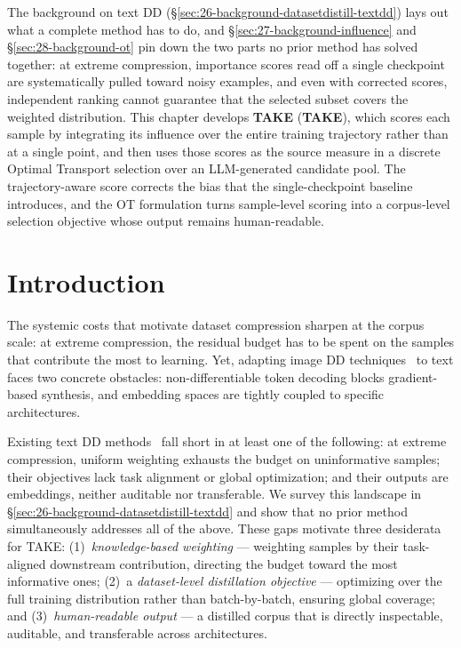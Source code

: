 \documentclass[12pt, a4paper, twoside]{book}
\numberwithin{equation}{chapter}
\theoremstyle{plain}
\theoremstyle{definition}
\theoremstyle{remark}
\newenvironment{foldable}{}{}
\begin{document}
\begin{foldable}
  The background on text \ac{DD} (\S\ref{sec:26-background-datasetdistill-textdd}) lays out what a complete method has to do, and \S\ref{sec:27-background-influence} and \S\ref{sec:28-background-ot} pin down the two parts no prior method has solved together: at extreme compression, importance scores read off a single checkpoint are systematically pulled toward noisy examples, and even with corrected scores, independent ranking cannot guarantee that the selected subset covers the weighted distribution.
  This chapter develops \textbf{\acl{TAKE}} (\textbf{\acs{TAKE}}), which scores each sample by integrating its influence over the entire training trajectory rather than at a single point, and then uses those scores as the source measure in a discrete Optimal Transport selection over an \ac{LLM}-generated candidate pool.
  The trajectory-aware score corrects the bias that the single-checkpoint baseline introduces, and the \ac{OT} formulation turns sample-level scoring into a corpus-level selection objective whose output remains human-readable.
\end{foldable}

\section{Introduction} \label{sec:51-research03-introduction}

\begin{foldable} The systemic costs that motivate dataset compression sharpen at the corpus scale: at extreme compression, the residual budget has to be spent on the samples that contribute the most to learning.
  Yet, adapting image \ac{DD} techniques~\cite{wang2018dataset,zhao2021dataset,zhao2023dataset} to text faces two concrete obstacles: non-differentiable token decoding blocks gradient-based synthesis, and embedding spaces are tightly coupled to specific architectures.
\end{foldable}

\begin{foldable} Existing text \ac{DD} methods~\cite{sucholutsky2021soft,li2021data,maekawa2023dataset,maekawa2024dilm,tao2024textual} fall short in at least one of the following: at extreme compression, uniform weighting exhausts the budget on uninformative samples; their objectives lack task alignment or global optimization; and their outputs are embeddings, neither auditable nor transferable.
  We survey this landscape in \S\ref{sec:26-background-datasetdistill-textdd} and show that no prior method simultaneously addresses all of the above.
  These gaps motivate three desiderata for TAKE:{
    (1)~\textit{knowledge-based weighting} --- weighting samples by their task-aligned downstream contribution, directing the budget toward the most informative ones;
    (2)~a \textit{dataset-level distillation objective} --- optimizing over the full training distribution rather than batch-by-batch, ensuring global coverage;
    and (3)~\textit{human-readable output} --- a distilled corpus that is directly inspectable, auditable, and transferable across architectures.
  }
\end{foldable}
\end{document}
